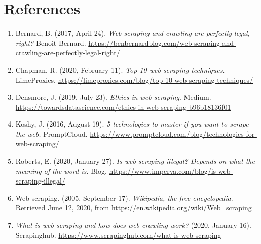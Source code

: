 \documentclass[]{article}
\begin{document}
\section{References}
\begin{enumerate}
	\item Bernard, B. (2017, April 24). \textit{Web scraping and crawling are perfectly legal, right?} Benoit Bernard. \url{https://benbernardblog.com/web-scraping-and-crawling-are-perfectly-legal-right/}
	
	\item Chapman, R. (2020, February 11). \textit{Top 10 web scraping techniques}. LimeProxies. \url{https://limeproxies.com/blog/top-10-web-scraping-techniques/}
	
	\item Densmore, J. (2019, July 23). \textit{Ethics in web scraping}. Medium. \url{https://towardsdatascience.com/ethics-in-web-scraping-b96b18136f01}
	
	\item Koshy, J. (2016, August 19). \textit{5 technologies to master if you want to scrape the web.} PromptCloud. \url{https://www.promptcloud.com/blog/technologies-for-web-scraping/}
	
	\item Roberts, E. (2020, January 27). \textit{Is web scraping illegal? Depends on what the meaning of the word is.} Blog. \url{https://www.imperva.com/blog/is-web-scraping-illegal/}
	
	\item Web scraping. (2005, September 17). \textit{Wikipedia, the free encyclopedia}. Retrieved June 12, 2020, from \url{https://en.wikipedia.org/wiki/Web\_scraping}
	
	\item \textit{What is web scraping and how does web crawling work?} (2020, January 16). Scrapinghub. \url{https://www.scrapinghub.com/what-is-web-scraping}
\end{enumerate}
\end{document}

